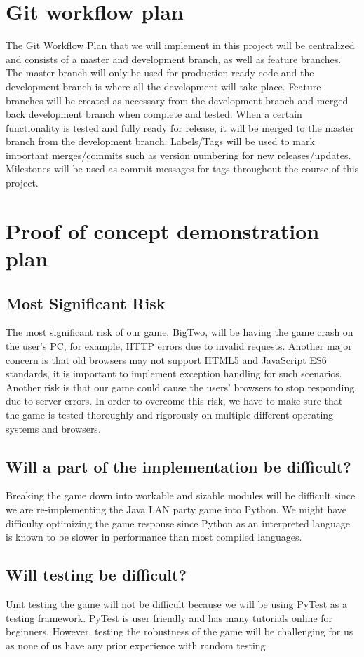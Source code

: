 \documentclass{article}
\begin{document}
\section{Git workflow plan}
The Git Workflow Plan that we will implement in this project will be centralized and consists of a master and development branch, as well as feature branches.
The master branch will only be used for production-ready code and the development branch is where all the development will take place. Feature branches will be created as necessary from the development branch and merged back development branch when complete and tested. When a certain functionality is tested and fully ready for release, it will be merged to the master branch from the development branch. Labels/Tags will be used to mark important merges/commits such as version numbering for new releases/updates. Milestones will be used as commit messages for tags throughout the course of this project.
\section{Proof of concept demonstration plan}
\subsection{Most Significant Risk}
The most significant risk of our game, BigTwo, will be having the game crash on the user's PC, for example, HTTP errors due to invalid requests. Another major concern is that old browsers may not support HTML5 and JavaScript ES6 standards, it is important to implement exception handling for such scenarios. Another risk is that our game could cause the users' browsers to stop responding, due to server errors. In order to overcome this risk, we have to make sure that the game is tested thoroughly and rigorously on multiple different operating systems and browsers.

\subsection{Will a part of the implementation be difficult?}
Breaking the game down into workable and sizable modules will be difficult since we are re-implementing the Java LAN party game into Python. We might have difficulty optimizing the game response since Python as an interpreted language is known to be slower in performance than most compiled languages.
\subsection{Will testing be difficult?}
Unit testing the game will not be difficult because we will be using PyTest as a testing framework. PyTest is user friendly and has many tutorials online for beginners. However, testing the robustness of the game will be challenging for us as none of us have any prior experience with random testing.
\end{document}
